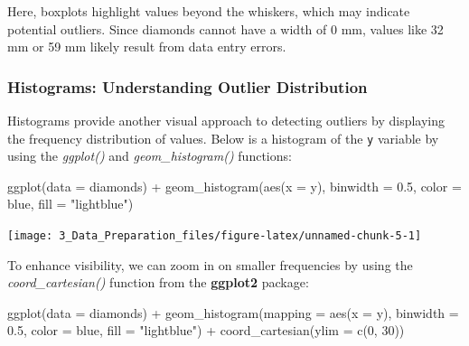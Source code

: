 \documentclass[
  11pt,
]{book}
\makeatletter
\newenvironment{Shaded}{}{}
\newcommand{\AttributeTok}[1]{#1}
\newcommand{\DecValTok}[1]{#1}
\newcommand{\FloatTok}[1]{#1}
\newcommand{\FunctionTok}[1]{#1}
\newcommand{\NormalTok}[1]{#1}
\newcommand{\SpecialCharTok}[1]{\textcolor[rgb]{0.39,0.39,0.39}{#1}}
\newcommand{\StringTok}[1]{\textcolor[rgb]{0.39,0.39,0.39}{#1}}
\newenvironment{kframe}{%
\medskip{}
\setlength{\fboxsep}{.8em}
 \def\at@end@of@kframe{}%
 \ifinner\ifhmode%
  \def\at@end@of@kframe{\end{minipage}}%
  \begin{minipage}{\columnwidth}%
 \fi\fi%
 \def\FrameCommand##1{\hskip\@totalleftmargin \hskip-\fboxsep
 \colorbox{shadecolor}{##1}\hskip-\fboxsep
     \hskip-\linewidth \hskip-\@totalleftmargin \hskip\columnwidth}%
 \MakeFramed {\advance\hsize-\width
   \@totalleftmargin\z@ \linewidth\hsize
   \@setminipage}}%
 {\par\unskip\endMakeFramed%
 \at@end@of@kframe}
\renewenvironment{Shaded}{\begin{kframe}}{\end{kframe}}
\theoremstyle{definition}
\theoremstyle{definition}
\theoremstyle{definition}
\theoremstyle{definition}
\theoremstyle{remark}
\makeatother
\begin{document}
Here, boxplots highlight values beyond the whiskers, which may indicate potential outliers. Since diamonds cannot have a width of 0 mm, values like 32 mm or 59 mm likely result from data entry errors.

\subsubsection*{Histograms: Understanding Outlier Distribution}\label{histograms-understanding-outlier-distribution}


Histograms provide another visual approach to detecting outliers by displaying the frequency distribution of values. Below is a histogram of the \texttt{y} variable by using the \emph{ggplot()} and \emph{geom\_histogram()} functions:

\begin{Shaded}
\begin{Highlighting}[]
\FunctionTok{ggplot}\NormalTok{(}\AttributeTok{data =}\NormalTok{ diamonds) }\SpecialCharTok{+}
    \FunctionTok{geom\_histogram}\NormalTok{(}\FunctionTok{aes}\NormalTok{(}\AttributeTok{x =}\NormalTok{ y), }\AttributeTok{binwidth =} \FloatTok{0.5}\NormalTok{, }\AttributeTok{color =} \StringTok{\textquotesingle{}blue\textquotesingle{}}\NormalTok{, }\AttributeTok{fill =} \StringTok{"lightblue"}\NormalTok{)}
\end{Highlighting}
\end{Shaded}

\begin{center}\texttt{[image: 3\_Data\_Preparation\_files/figure-latex/unnamed-chunk-5-1]} \end{center}

To enhance visibility, we can zoom in on smaller frequencies by using the \emph{coord\_cartesian()} function from the \textbf{ggplot2} package:

\begin{Shaded}
\begin{Highlighting}[]
\FunctionTok{ggplot}\NormalTok{(}\AttributeTok{data =}\NormalTok{ diamonds) }\SpecialCharTok{+}
    \FunctionTok{geom\_histogram}\NormalTok{(}\AttributeTok{mapping =} \FunctionTok{aes}\NormalTok{(}\AttributeTok{x =}\NormalTok{ y), }\AttributeTok{binwidth =} \FloatTok{0.5}\NormalTok{, }\AttributeTok{color =} \StringTok{\textquotesingle{}blue\textquotesingle{}}\NormalTok{, }\AttributeTok{fill =} \StringTok{"lightblue"}\NormalTok{) }\SpecialCharTok{+} 
    \FunctionTok{coord\_cartesian}\NormalTok{(}\AttributeTok{ylim =} \FunctionTok{c}\NormalTok{(}\DecValTok{0}\NormalTok{, }\DecValTok{30}\NormalTok{))}
\end{Highlighting}
\end{Shaded}
\end{document}
